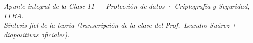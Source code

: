 \documentclass[11pt,a4paper]{article}
\begin{document}
\vfill
\begin{center}\small\itshape\color{black!60}
Apunte integral de la Clase 11 — Protección de datos · Criptografía y Seguridad, ITBA.\\
Síntesis fiel de la teoría (transcripción de la clase del Prof.\ Leandro Suárez + diapositivas oficiales).
\end{center}
\end{document}
